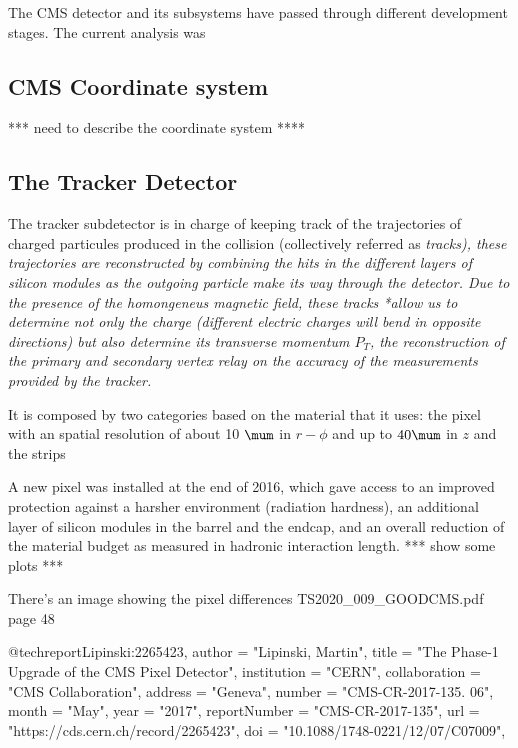 The CMS detector and its subsystems have passed through different development
stages. The current analysis was

\subsection{CMS Coordinate system}

*** need to describe the coordinate system ****

\subsection{The Tracker Detector}

The tracker subdetector is in charge of keeping track of the trajectories of
charged particules produced in the collision (collectively referred as \em{tracks}),
these trajectories are reconstructed by combining the hits in the different layers
of silicon modules as the outgoing particle make its way through the detector.
Due to the presence of the homongeneus magnetic field, these tracks *allow us to
determine not only the charge (different electric charges will bend in opposite directions)
but also determine its transverse momentum $P_{T}$, the reconstruction of the primary
and secondary vertex relay on the accuracy of the measurements provided by the tracker.

It is composed by two categories based on the material that it uses: the pixel with
an spatial resolution of about 10 $\mum$ in $r-\phi$ and up to $40\mum$ in $z$
and the strips

A new pixel was installed at the end of 2016, which gave access to an improved
protection against a harsher environment (radiation hardness), an additional
layer of silicon modules in the barrel and the endcap, and an overall reduction
of the material budget as measured in hadronic interaction length. *** show some plots ***

There's an image showing the pixel differences TS2020_009_GOODCMS.pdf page 48

@techreport{Lipinski:2265423,
      author        = "Lipinski, Martin",
      title         = "{The Phase-1 Upgrade of the CMS Pixel Detector}",
      institution   = "CERN",
      collaboration = "CMS Collaboration",
      address       = "Geneva",
      number        = "CMS-CR-2017-135. 06",
      month         = "May",
      year          = "2017",
      reportNumber  = "CMS-CR-2017-135",
      url           = "https://cds.cern.ch/record/2265423",
      doi           = "10.1088/1748-0221/12/07/C07009",
}


